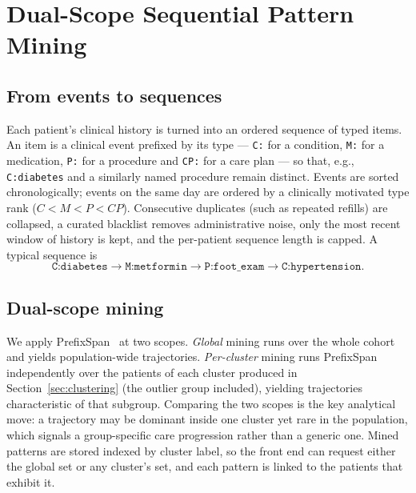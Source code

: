 \section{Dual-Scope Sequential Pattern Mining}\label{sec:sequences}

\subsection{From events to sequences}
Each patient's clinical history is turned into an ordered sequence of typed
items. An item is a clinical event prefixed by its type --- \texttt{C:} for a
condition, \texttt{M:} for a medication, \texttt{P:} for a procedure and
\texttt{CP:} for a care plan --- so that, e.g., \texttt{C:diabetes} and a
similarly named procedure remain distinct. Events are sorted chronologically;
events on the same day are ordered by a clinically motivated type rank
($C\!<\!M\!<\!P\!<\!CP$). Consecutive duplicates (such as repeated refills) are
collapsed, a curated blacklist removes administrative noise, only the most recent
window of history is kept, and the per-patient sequence length is capped. A
typical sequence is
\[
  \texttt{C:diabetes} \rightarrow \texttt{M:metformin} \rightarrow
  \texttt{P:foot\_exam} \rightarrow \texttt{C:hypertension}.
\]

\subsection{Dual-scope mining}
We apply PrefixSpan~\cite{Pei2004PrefixSpan} at two scopes. \emph{Global} mining
runs over the whole cohort and yields population-wide trajectories.
\emph{Per-cluster} mining runs PrefixSpan independently over the patients of each
cluster produced in Section~\ref{sec:clustering} (the outlier group included),
yielding trajectories characteristic of that subgroup. Comparing the two scopes
is the key analytical move: a trajectory may be dominant inside one cluster yet
rare in the population, which signals a group-specific care progression rather
than a generic one. Mined patterns are stored indexed by cluster label, so the
front end can request either the global set or any cluster's set, and each
pattern is linked to the patients that exhibit it.

